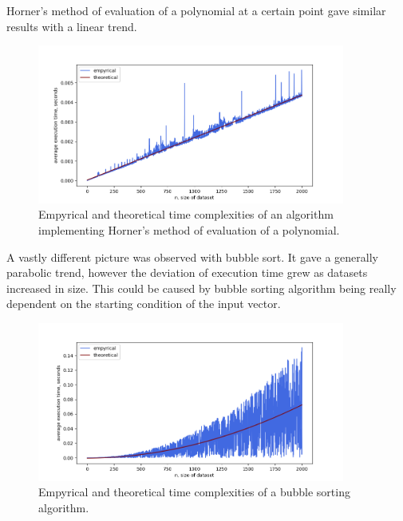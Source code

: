 \documentclass[12pt, a4paper]{article}
\begin{document}
Horner's method of evaluation of a polynomial at a certain point gave similar results with a linear trend.
\begin{figure}[!h]
\centering
\includegraphics[width=0.9\textwidth]{polyhorner.png}
\caption{Empyrical and theoretical time complexities of an algorithm implementing Horner's method of evaluation of a polynomial.}
\end{figure}

A vastly different picture was observed with bubble sort. It gave a generally parabolic trend, however the deviation of execution time grew as datasets increased in size. This could be caused by bubble sorting algorithm being really dependent on the starting condition of the input vector.
\begin{figure}[!h]
\centering
\includegraphics[width=0.9\textwidth]{bubblesort.png}
\caption{Empyrical and theoretical time complexities of a bubble sorting algorithm.}
\end{figure}
\end{document}
